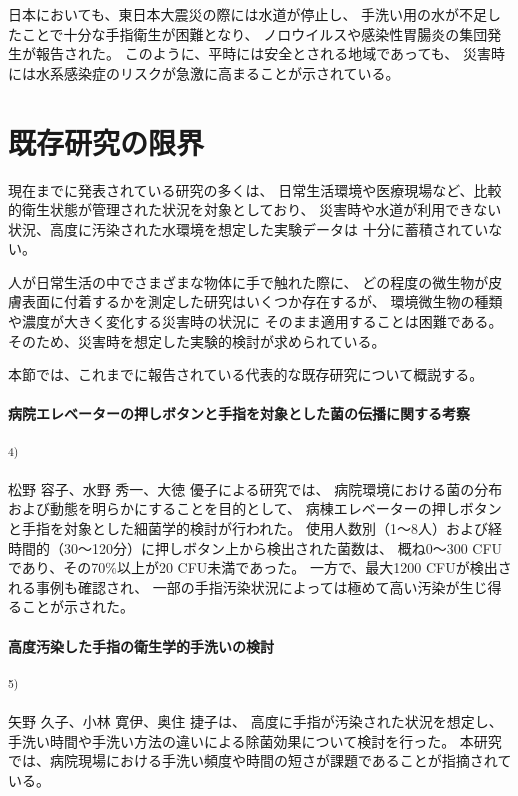 日本においても、東日本大震災の際には水道が停止し、
手洗い用の水が不足したことで十分な手指衛生が困難となり、
ノロウイルスや感染性胃腸炎の集団発生が報告された。
このように、平時には安全とされる地域であっても、
災害時には水系感染症のリスクが急激に高まることが示されている。


\section{既存研究の限界}

現在までに発表されている研究の多くは、
日常生活環境や医療現場など、比較的衛生状態が管理された状況を対象としており、
災害時や水道が利用できない状況、高度に汚染された水環境を想定した実験データは
十分に蓄積されていない。

人が日常生活の中でさまざまな物体に手で触れた際に、
どの程度の微生物が皮膚表面に付着するかを測定した研究はいくつか存在するが、
環境微生物の種類や濃度が大きく変化する災害時の状況に
そのまま適用することは困難である。
そのため、災害時を想定した実験的検討が求められている。

本節では、これまでに報告されている代表的な既存研究について概説する。

\paragraph{病院エレベーターの押しボタンと手指を対象とした菌の伝播に関する考察}\textsuperscript{4)}

松野 容子、水野 秀一、大徳 優子による研究では、
病院環境における菌の分布および動態を明らかにすることを目的として、
病棟エレベーターの押しボタンと手指を対象とした細菌学的検討が行われた。
使用人数別（1～8人）および経時間的（30～120分）に押しボタン上から検出された菌数は、
概ね0～300 CFUであり、その70\%以上が20 CFU未満であった。
一方で、最大1200 CFUが検出される事例も確認され、
一部の手指汚染状況によっては極めて高い汚染が生じ得ることが示された。

\paragraph{高度汚染した手指の衛生学的手洗いの検討}\textsuperscript{5)}

矢野 久子、小林 寛伊、奥住 捷子は、
高度に手指が汚染された状況を想定し、
手洗い時間や手洗い方法の違いによる除菌効果について検討を行った。
本研究では、病院現場における手洗い頻度や時間の短さが課題であることが指摘されている。

